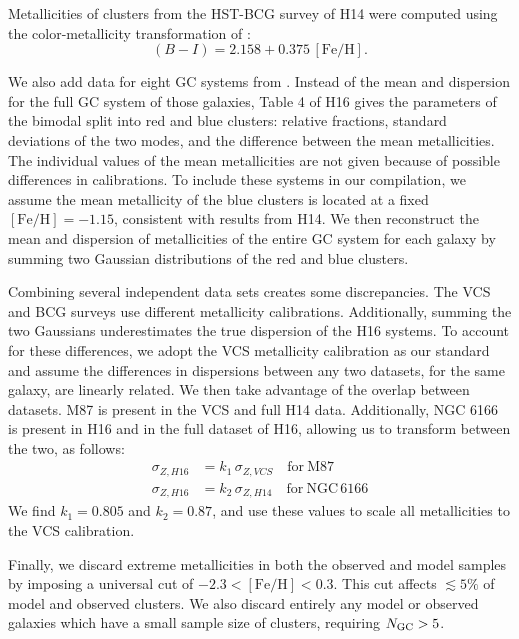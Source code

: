 \documentclass[fleqn,usenatbib]{mnras}
\newcommand{\feh}{\mathrm{[Fe/H]}}
\begin{document}
Metallicities of clusters from the HST-BCG survey of H14 were computed using the color-metallicity transformation of \cite{harris_etal06}:
\begin{equation}
  (B-I) = 2.158 + 0.375 \,\feh.
  \label{eq:color-met2}
\end{equation}

We also add data for eight GC systems from \citet[][hereafter H16]{harris_etal16_bcg2}. Instead of the mean and dispersion for the full GC system of those galaxies, Table 4 of H16 gives the parameters of the bimodal split into red and blue clusters: relative fractions, standard deviations of the two modes, and the difference between the mean metallicities. The individual values of the mean metallicities are not given because of possible differences in calibrations. To include these systems in our compilation, we assume the mean metallicity of the blue clusters is located at a fixed $\feh = -1.15$, consistent with results from H14. We then reconstruct the mean and dispersion of metallicities of the entire GC system for each galaxy by summing two Gaussian distributions of the red and blue clusters.

Combining several independent data sets creates some discrepancies. The VCS and BCG surveys use different metallicity calibrations. Additionally, summing the two Gaussians underestimates the true dispersion of the H16 systems. To account for these differences, we adopt the VCS metallicity calibration as our standard and assume the differences in dispersions between any two datasets, for the same galaxy, are linearly related. We then take advantage of the overlap between datasets. M87 is present in the VCS and full H14 data. Additionally, NGC 6166 is present in H16 and in the full dataset of H16, allowing us to transform between the two, as follows:
\begin{align}
  \sigma_{Z,H16} & = k_1 \, \sigma_{Z,VCS} \quad\mathrm{for\ M87}\nonumber \\
  \sigma_{Z,H16} & = k_2 \, \sigma_{Z,H14} \quad\mathrm{for\ NGC\, 6166}
  \label{eqn:z_conversion}
\end{align}
We find $k_1 = 0.805$ and $k_2 = 0.87$, and use these values to scale all metallicities to the VCS calibration.

Finally, we discard extreme metallicities in both the observed and model samples by imposing a universal cut of $-2.3 < \feh < 0.3$. This cut affects $\lesssim 5\%$ of model and observed clusters. We also discard entirely any model or observed galaxies which have a small sample size of clusters, requiring $N_{\rm GC} > 5$.
\end{document}
